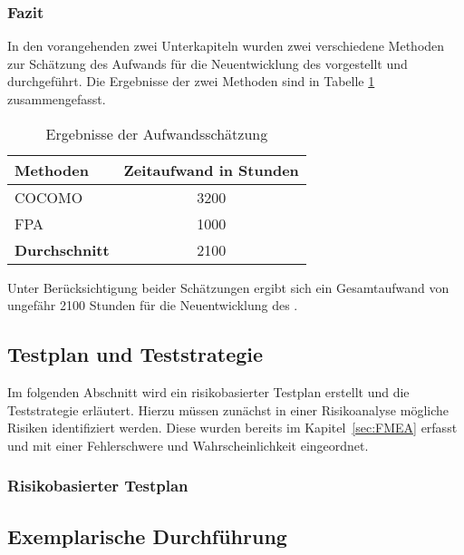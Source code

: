 \subsubsection{Fazit}
In den vorangehenden zwei Unterkapiteln wurden zwei verschiedene Methoden zur Schätzung des Aufwands für die Neuentwicklung des  vorgestellt und durchgeführt.
Die Ergebnisse der zwei Methoden sind in Tabelle \ref{tab:aufwandsschaetzungErgebnisse} zusammengefasst.
\begin{table}[H]
  \centering
  \begin{tabular}{|l|c|}
    \hline
    \textbf{Methoden} & \textbf{Zeitaufwand} in Stunden \\
    \hline
    \ac{COCOMO} & 3200 \\
    \hline
    \ac{FPA} & 1000 \\
    \hline
    \textbf{Durchschnitt} & 2100 \\
    \hline
  \end{tabular}
  \caption{Ergebnisse der Aufwandsschätzung}
  \label{tab:aufwandsschaetzungErgebnisse}
\end{table}

\noindent{}Unter Berücksichtigung beider Schätzungen ergibt sich ein Gesamtaufwand von ungefähr 2100 Stunden für die Neuentwicklung des .

\subsection{Testplan und Teststrategie}
Im folgenden Abschnitt wird ein risikobasierter Testplan erstellt und die Teststrategie erläutert.
Hierzu müssen zunächst in einer Risikoanalyse mögliche Risiken identifiziert werden.
Diese wurden bereits im Kapitel~\ref{sec:FMEA} erfasst und mit einer Fehlerschwere und Wahrscheinlichkeit eingeordnet.
\subsubsection{Risikobasierter Testplan}

\subsection{Exemplarische Durchführung}